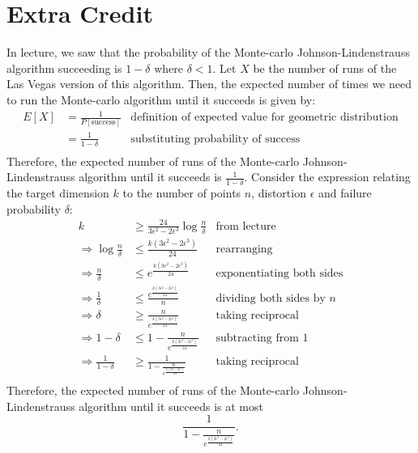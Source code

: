 \documentclass[11pt, fleqn]{article}
\begin{document}
\section*{Extra Credit}
In lecture, we saw that the probability of the Monte-carlo Johnson-Lindenstrauss algorithm succeeding is $1 - \delta$ where $\delta < 1$. Let $X$ be the number of runs of the Las Vegas version
of this algorithm. Then, the expected number of times we need to run the Monte-carlo algorithm until it succeeds is given by:
\begin{align*}
    E[X] &= \frac{1}{P[\text{success}]} & \text{definition of expected value for geometric distribution} \\
    &= \frac{1}{1 - \delta} & \text{substituting probability of success} \\
\end{align*}
Therefore, the expected number of runs of the Monte-carlo Johnson-Lindenstrauss algorithm until it succeeds is $\frac{1}{1 - \delta}$.
Consider the expression relating the target dimension $k$ to the number of points $n$, distortion $\epsilon$ and failure probability $\delta$:
\begin{align*}
    k &\geq \frac{24}{3\epsilon^2 - 2\epsilon^3} \log \frac{n}{\delta} & \text{from lecture} \\
    \Rightarrow \log \frac{n}{\delta} &\leq \frac{k(3\epsilon^2 - 2\epsilon^3)}{24} & \text{rearranging} \\
    \Rightarrow \frac{n}{\delta} &\leq e^{\frac{k(3\epsilon^2 - 2\epsilon^3)}{24}} & \text{exponentiating both sides} \\
    \Rightarrow \frac{1}{\delta} &\leq \frac{e^{\frac{k(3\epsilon^2 - 2\epsilon^3)}{24}}}{n} & \text{dividing both sides by } n \\
    \Rightarrow \delta &\geq \frac{n}{e^{\frac{k(3\epsilon^2 - 2\epsilon^3)}{24}}} & \text{taking reciprocal} \\
    \Rightarrow 1 - \delta &\leq 1 - \frac{n}{e^{\frac{k(3\epsilon^2 - 2\epsilon^3)}{24}}} & \text{subtracting from }1 \\
    \Rightarrow \frac{1}{1 - \delta} &\geq \frac{1}{1 - \frac{n}{e^{\frac{k(3\epsilon^2 - 2\epsilon^3)}{24}}}} & \text{taking reciprocal} \\
\end{align*}
Therefore, the expected number of runs of the Monte-carlo Johnson-Lindenstrauss algorithm until it succeeds is at most
\[\frac{1}{1 - \frac{n}{e^{\frac{k(3\epsilon^2 - 2\epsilon^3)}{24}}}}.\]
\end{document}

